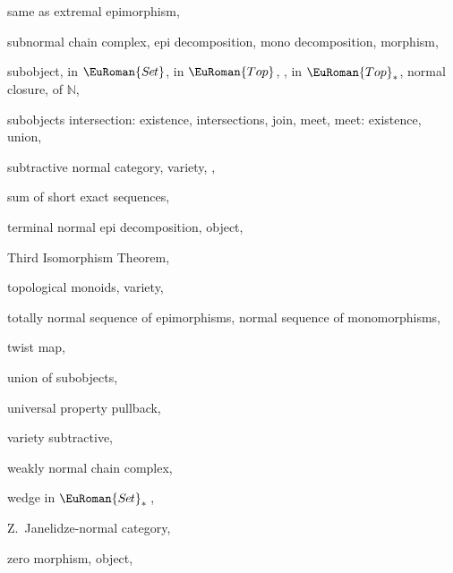 \documentclass [12pt,oneside]{book}%
\theoremstyle{captionstyle}  %
\newcommand{\NNr}{\mathbb{N}}		%
\newcommand{\Sets}{\EuRoman{S{\kern-0.12ex}e{\hskip-0.14ex}t}}			                       %
\newcommand{\SetsBsd}{\EuRoman{S{\kern-0.12ex}e{\hskip-0.14ex}t}_{\ast}\,}	%
\newcommand{\Tops}{\EuRoman{Top}}											%
\newcommand{\TopsBsd}{\EuRoman{Top}_{\ast}}	%
\begin{document}
\begin{theindex}
    \subitem same as extremal epimorphism, 
    \item subnormal
    \subitem chain complex, 
    \subitem epi decomposition, 
    \subitem mono decomposition, 
    \subitem morphism, 
    \item subobject, 
    \subitem in $\Sets $, 
    \subitem in $\Tops $, , 
    \subitem in $\TopsBsd $, 
    \subitem normal closure, 
    \subitem of $\NNr $, 
    \item subobjects
    \subitem intersection: existence, 
    \subitem intersections, 
    \subitem join, 
    \subitem meet, 
    \subitem meet: existence, 
    \subitem union, 
    \item subtractive
    \subitem normal category, 
    \subitem variety, , 
    \item sum
    \subitem of short exact sequences, 

    \indexspace

    \item terminal
    \subitem normal epi decomposition, 
    \subitem object, 
    \item Third Isomorphism Theorem, 
    \item topological
    \subitem monoids, 
    \subitem variety, 
    \item totally
    \subitem normal sequence of epimorphisms, 
    \subitem normal sequence of monomorphisms, 
    \item twist map, 

    \indexspace

    \item union
    \subitem of subobjects, 
    \item universal property
    \subitem pullback, 

    \indexspace

    \item variety
    \subitem subtractive, 

    \indexspace

    \item weakly normal chain complex, 
    \item wedge in $\SetsBsd $, 

    \indexspace

    \item Z.~Janelidze-normal category, 
    \item zero
    \subitem morphism, 
    \subitem object, 

\end{theindex}
\end{document}

